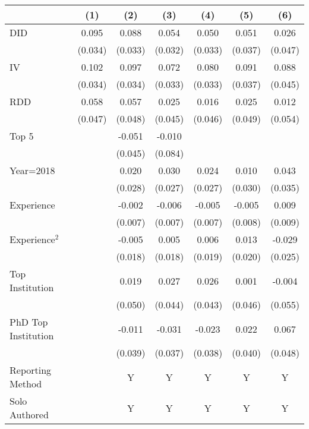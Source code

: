 \begin{tabular}{l*{6}{c}}
\hline\hline
                &\multicolumn{1}{c}{(1)}&\multicolumn{1}{c}{(2)}&\multicolumn{1}{c}{(3)}&\multicolumn{1}{c}{(4)}&\multicolumn{1}{c}{(5)}&\multicolumn{1}{c}{(6)}\\
\hline
DID             &    0.095&    0.088&    0.054&    0.050&    0.051&    0.026\\
                &  (0.034)&  (0.033)&  (0.032)&  (0.033)&  (0.037)&  (0.047)\\
IV              &    0.102&    0.097&    0.072&    0.080&    0.091&    0.088\\
                &  (0.034)&  (0.034)&  (0.033)&  (0.033)&  (0.037)&  (0.045)\\
RDD             &    0.058&    0.057&    0.025&    0.016&    0.025&    0.012\\
                &  (0.047)&  (0.048)&  (0.045)&  (0.046)&  (0.049)&  (0.054)\\
Top 5           &         &   -0.051&   -0.010&         &         &         \\
                &         &  (0.045)&  (0.084)&         &         &         \\
Year=2018       &         &    0.020&    0.030&    0.024&    0.010&    0.043\\
                &         &  (0.028)&  (0.027)&  (0.027)&  (0.030)&  (0.035)\\
Experience      &         &   -0.002&   -0.006&   -0.005&   -0.005&    0.009\\
                &         &  (0.007)&  (0.007)&  (0.007)&  (0.008)&  (0.009)\\
Experience$^2$  &         &   -0.005&    0.005&    0.006&    0.013&   -0.029\\
                &         &  (0.018)&  (0.018)&  (0.019)&  (0.020)&  (0.025)\\
Top Institution &         &    0.019&    0.027&    0.026&    0.001&   -0.004\\
                &         &  (0.050)&  (0.044)&  (0.043)&  (0.046)&  (0.055)\\
PhD Top Institution&         &   -0.011&   -0.031&   -0.023&    0.022&    0.067\\
                &         &  (0.039)&  (0.037)&  (0.038)&  (0.040)&  (0.048)\\
Reporting Method &         &        Y&        Y&        Y&        Y&        Y\\
Solo Authored   &         &        Y&        Y&        Y&        Y&        Y\\

\end{tabular}
